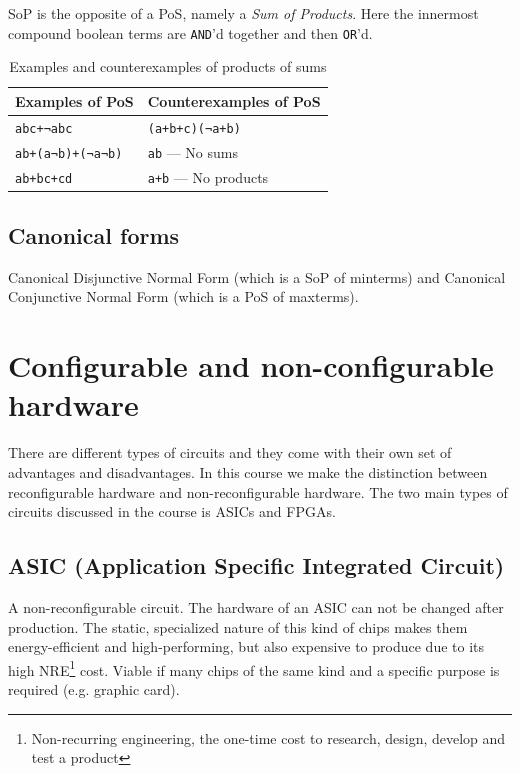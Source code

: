 \documentclass[a4paper,11pt]{report}
\newcommand{\enot}{¬}
\begin{document}
SoP is the opposite of a PoS, namely a \textit{Sum of Products}. Here
the innermost compound boolean terms are \texttt{AND}'d together and
then \texttt{OR}'d.

\begin{table}[H]
  \centering
  \begin{tabular}{l | l}
    \textbf{Examples of PoS} & \textbf{Counterexamples of PoS} \\ \hline
    \texttt{abc+\enot{a}bc}                    & \texttt{(a+b+c)(\enot{a}+b)} \\
    \texttt{ab+(a\enot{b})+(\enot{a}\enot{b})} & \texttt{ab} --- No sums \\
    \texttt{ab+bc+cd}                          & \texttt{a+b} --- No products
  \end{tabular}
  \caption[Example of PoS]{Examples and counterexamples of products of sums}%
  \label{tab:pos}
\end{table}

\subsection{Canonical forms}

Canonical Disjunctive Normal Form (which is a SoP of minterms) and
Canonical Conjunctive Normal Form (which is a PoS of
maxterms).

\newpage

\section{Configurable and non-configurable hardware}
There are different types of circuits and they come with their own set
of advantages and disadvantages. In this course we make the
distinction between reconfigurable hardware and non-reconfigurable
hardware. The two main types of circuits discussed in the course is
ASICs and FPGAs.

\subsection{ASIC (Application Specific Integrated Circuit)}
A non-reconfigurable circuit. The hardware of an ASIC can not be
changed after production. The static, specialized nature of this kind
of chips makes them energy-efficient and high-performing, but also
expensive to produce due to its high NRE\footnote{Non-recurring
  engineering, the one-time cost to research, design, develop and test
  a product} cost. Viable if many chips of the same kind and a
specific purpose is required (e.g. graphic card).
\end{document}
